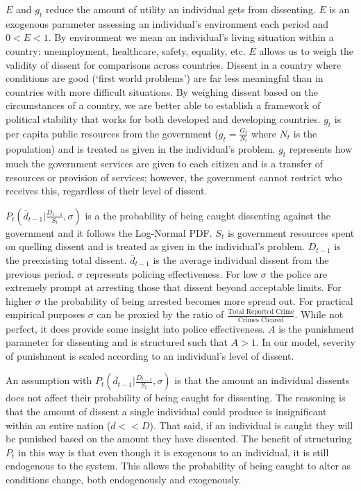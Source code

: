\documentclass[12pt]{article}
\begin{document}
\begin{spacing}{1.5}
$E$ and $g_t$ reduce the amount of utility an individual gets from dissenting. $E$ is an exogenous parameter assessing an individual's environment each period and $0<E<1$. By environment we mean an individual's living situation within a country: unemployment, healthcare, safety, equality, etc. $E$ allows us to weigh the validity of dissent for comparisons across countries. Dissent in a country where conditions are good (`first world problems') are far less meaningful than in countries with more difficult situations. By weighing dissent based on the circumstances of a country, we are better able to establish a framework of political stability that works for both developed and developing countries. $g_t$ is per capita public resources from the government ($g_t=\frac{G_t}{N_t}$ where $N_t$ is the population) and is treated as given in the individual's problem. $g_t$ represents how much the government services are given to each citizen and is a transfer of resources or provision of services; however, the government cannot restrict who receives this, regardless of their level of dissent.   


$ P_t \left( \bar{d}_{t-1} \Bigg|\frac{D_{t-1}}{S_t},\sigma \right)$ is a the probability of being caught dissenting against the government and it follows the Log-Normal PDF. $S_t$ is government resources spent on quelling dissent and is treated as given in the individual's problem. $D_{t-1}$ is the preexisting total dissent. $\bar{d}_{t-1}$ is the average individual dissent from the previous period. $\sigma$ represents policing effectiveness. For low $\sigma$ the police are extremely prompt at arresting those that dissent beyond acceptable limits. For higher $\sigma$ the probability of being arrested becomes more spread out. For practical empirical purposes $\sigma$ can be proxied by the ratio of $\frac{\text{Total Reported Crime}}{\text{Crimes Cleared}}$. While not perfect, it does provide some insight into police effectiveness. $A$ is the punishment parameter for dissenting and is structured such that $A>1$. In our model, severity of punishment is scaled according to an individual's level of dissent. 

An assumption with $P_t \left( \bar{d}_{t-1} \Bigg|\frac{D_{t-1}}{S_t},\sigma \right)$ is that the amount an individual dissents does not affect their probability of being caught for dissenting. The reasoning is that the amount of dissent a single individual could produce is insignificant within an entire nation ($d<<D$). That said, if an individual is caught they will be punished based on the amount they have dissented. The benefit of structuring $P_t$ in this way is that even though it is exogenous to an individual, it is still endogenous to the system. This allows the probability of being caught to alter as conditions change, both endogenously and exogenously.    




\end{spacing}
\end{document}
